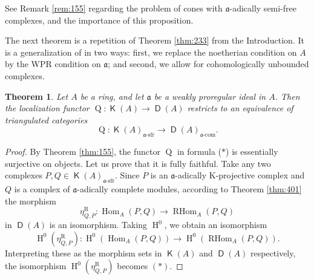 \documentclass[10pt]{amsart}
\newtheorem{thm}[equation]{Theorem}
\theoremstyle{definition}
\numberwithin{equation}{section}
\newcommand{\opn}{\operatorname}
\newcommand{\cat}[1]{\operatorname{\mathsf{#1}}}
\newcommand{\mfrak}[1]{\mathfrak{#1}}
\newcommand{\mrm}[1]{\mathrm{#1}}
\renewcommand{\a}{\mfrak{a}}
\newcommand{\tup}[1]{\textrm{#1}}
\begin{document}
See Remark \ref{rem:155} regarding the problem of cones with $\a$-adically
semi-free complexes, and the importance of this proposition.

The next theorem is a repetition of Theorem \ref{thm:233} from the
Introduction. It is a generalization of \cite[Theorem 1.19]{PSY2} in
two ways: first, we replace the noetherian condition on $A$ by the WPR
condition on $\a$; and second, we allow for cohomologically unbounded
complexes.

\begin{thm} \label{thm:135}
Let $A$ be a ring, and let $\a$ be a weakly proregular ideal in $A$.
Then the localization functor
$\opn{Q} : \cat{K}(A) \to \cat{D}(A)$
restricts to an equivalence of triangulated categories
\[ \tag{$*$}  \opn{Q} : \cat{K}(A)_{\tup{$\a$-sfr}} \to
\cat{D}(A)_{\tup{$\a$-com}} . \]
\end{thm}

\begin{proof}
By Theorem \ref{thm:155}, the functor $\opn{Q}$ in formula ($*$) is essentially
surjective on objects.
Let us prove that it is fully faithful.
Take any two complexes $P, Q \in \cat{K}(A)_{\tup{$\a$-sfr}}$.
Since $P$ is an $\a$-adically K-projective complex and $Q$ is a complex of
$\a$-adically complete modules, according to Theorem \ref{thm:401} the morphism
\[ \eta^{\mrm{R}}_{Q, P} : \opn{Hom}_{A}(P, Q) \to
\opn{RHom}_{A}(P, Q) \]
in $\cat{D}(A)$ is an isomorphism.
Taking $\opn{H}^0$, we obtain an isomorphism
\[ \opn{H}^0(\eta^{\mrm{R}}_{Q, P}) :
\opn{H}^0(\opn{Hom}_{A}(P, Q)) \to
\opn{H}^0(\opn{RHom}_{A}(P, Q)) . \]
Interpreting these as the morphism sets in
$\cat{K}(A)$ and $\cat{D}(A)$ respectively, the isomorphism
$\opn{H}^0(\eta^{\mrm{R}}_{Q, P})$ becomes $(*)$.
\end{proof}
\end{document}
